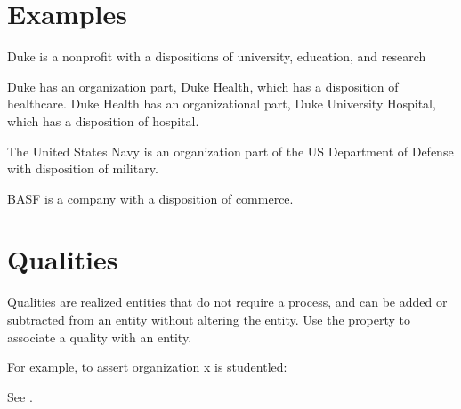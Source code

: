 \documentclass[letterpaper,10pt,english]{sphinxmanual}
\begin{document}
\section{Examples}
\label{\detokenize{organizations:examples}}
\begin{sphinxShadowBox}

\sphinxAtStartPar
Duke is a non\sphinxhyphen{}profit with a dispositions of university, education, and research

\sphinxAtStartPar
Duke has an organization part, Duke Health, which has a disposition of
healthcare.  Duke Health has an organizational part, Duke University Hospital,
which has a disposition of hospital.
\end{sphinxShadowBox}

\begin{sphinxShadowBox}

\sphinxAtStartPar
The United States Navy is an organization part of the US Department of Defense
with disposition of military.
\end{sphinxShadowBox}

\begin{sphinxShadowBox}

\sphinxAtStartPar
BASF is a company with a disposition of commerce.
\end{sphinxShadowBox}


\section{Qualities}
\label{\detokenize{organizations:qualities}}
\sphinxAtStartPar
Qualities are realized entities that do not require a process, and can be added or
subtracted from an entity without altering the entity.  Use the {\hyperref[\detokenize{doc-RO_0000086::doc}]{}} property to associate a quality with an entity.

\sphinxAtStartPar
For example, to assert organization x is student\sphinxhyphen{}led:

\begin{sphinxVerbatim}[commandchars=\\\{\}]
  
  
\end{sphinxVerbatim}

\sphinxAtStartPar
See {\hyperref[\detokenize{organizations:table-3}]{}}.
\end{document}
